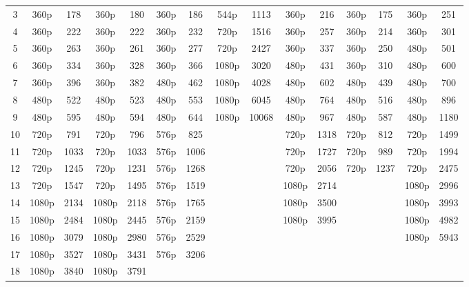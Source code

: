 \begin{table}[!htb]
{\begin{tabular}{c|cc|cc|cc|cc|cc|cc|cc}
3 &  360p & 178 &  360p & 180 &  360p & 186 &  544p & 1113 &  360p & 216 &  360p & 175 &  360p & 251 \\
4 &  360p & 222 &  360p & 222 &  360p & 232 &  720p & 1516 &  360p & 257 &  360p & 214 &  360p & 301 \\
5 &  360p & 263 &  360p & 261 &  360p & 277 &  720p & 2427 &  360p & 337 &  360p & 250 &  480p & 501 \\
6 &  360p & 334 &  360p & 328 &  360p & 366 &  1080p & 3020 &  480p & 431 &  360p & 310 &  480p & 600 \\
7 &  360p & 396 &  360p & 382 &  480p & 462 &  1080p & 4028 &  480p & 602 &  480p & 439 &  480p & 700 \\
8 &  480p & 522 &  480p & 523 &  480p & 553 &  1080p & 6045 &  480p & 764 &  480p & 516 &  480p & 896 \\
9 &  480p & 595 &  480p & 594 &  480p & 644 &  1080p & 10068 &  480p & 967 &  480p & 587 &  480p & 1180 \\
10 &  720p & 791 &  720p & 796 &  576p & 825 &  &  &  720p & 1318 &  720p & 812 &  720p & 1499 \\
11 &  720p & 1033 &  720p & 1033 &  576p & 1006 &  &  &  720p & 1727 &  720p & 989 &  720p & 1994 \\
12 &  720p & 1245 &  720p & 1231 &  576p & 1268 &  &  &  720p & 2056 &  720p & 1237 &  720p & 2475 \\
13 &  720p & 1547 &  720p & 1495 &  576p & 1519 &  &  &  1080p & 2714 &  &  &  1080p & 2996 \\
14 &  1080p & 2134 &  1080p & 2118 &  576p & 1765 &  &  &  1080p & 3500 &  &  &  1080p & 3993 \\
15 &  1080p & 2484 &  1080p & 2445 &  576p & 2159 &  &  &  1080p & 3995 &  &  &  1080p & 4982 \\
16 &  1080p & 3079 &  1080p & 2980 &  576p & 2529 &  &  &  &  &  &  &  1080p & 5943 \\
17 &  1080p & 3527 &  1080p & 3431 &  576p & 3206 &  &  &  &  &  &  &  &  \\
18 &  1080p & 3840 &  1080p & 3791 &  &  &  &  &  &  &  &  &  &  \\

\bottomrule[2.0pt]
\end{tabular}}
\label{tab:730_videos}
\end{table}

